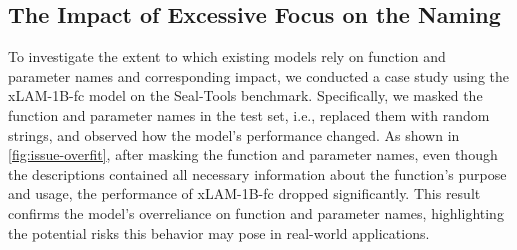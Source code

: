 \documentclass{article}
\begin{document}


\subsection{The Impact of Excessive Focus on the Naming}

To investigate the extent to which existing models rely on function and parameter names and corresponding impact, we conducted a case study using the xLAM-1B-fc model on the Seal-Tools benchmark. Specifically, we masked the function and parameter names in the test set, i.e., replaced them with random strings, and observed how the model's performance changed. As shown in \autoref{fig:issue-overfit}, after masking the function and parameter names, even though the descriptions contained all necessary information about the function's purpose and usage, the performance of xLAM-1B-fc dropped significantly. This result confirms the model's overreliance on function and parameter names, highlighting the potential risks this behavior may pose in real-world applications.
\end{document}
